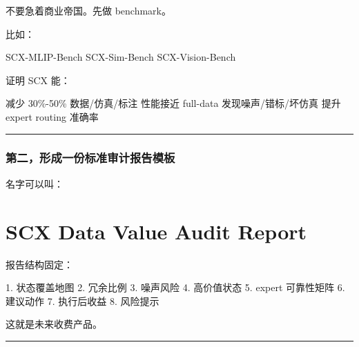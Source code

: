 \documentclass[
  12pt,
]{ctexart}
\newenvironment{Shaded}{}{}
\newcommand{\NormalTok}[1]{#1}
\begin{document}
不要急着商业帝国。先做 benchmark。

比如：

\begin{Shaded}
\begin{Highlighting}[]
\NormalTok{SCX{-}MLIP{-}Bench}
\NormalTok{SCX{-}Sim{-}Bench}
\NormalTok{SCX{-}Vision{-}Bench}
\end{Highlighting}
\end{Shaded}

证明 SCX 能：

\begin{Shaded}
\begin{Highlighting}[]
\NormalTok{减少 30\%{-}50\% 数据/仿真/标注}
\NormalTok{性能接近 full{-}data}
\NormalTok{发现噪声/错标/坏仿真}
\NormalTok{提升 expert routing 准确率}
\end{Highlighting}
\end{Shaded}

\begin{center}\rule{0.5\linewidth}{0.5pt}\end{center}

\subsubsection{第二，形成一份标准审计报告模板}\label{ux7b2cux4e8cux5f62ux6210ux4e00ux4efdux6807ux51c6ux5ba1ux8ba1ux62a5ux544aux6a21ux677f}

名字可以叫：

\section{\texorpdfstring{\textbf{SCX Data Value Audit
Report}}{SCX Data Value Audit Report}}\label{scx-data-value-audit-report}

报告结构固定：

\begin{Shaded}
\begin{Highlighting}[]
\NormalTok{1. 状态覆盖地图}
\NormalTok{2. 冗余比例}
\NormalTok{3. 噪声风险}
\NormalTok{4. 高价值状态}
\NormalTok{5. expert 可靠性矩阵}
\NormalTok{6. 建议动作}
\NormalTok{7. 执行后收益}
\NormalTok{8. 风险提示}
\end{Highlighting}
\end{Shaded}

这就是未来收费产品。

\begin{center}\rule{0.5\linewidth}{0.5pt}\end{center}
\end{document}
